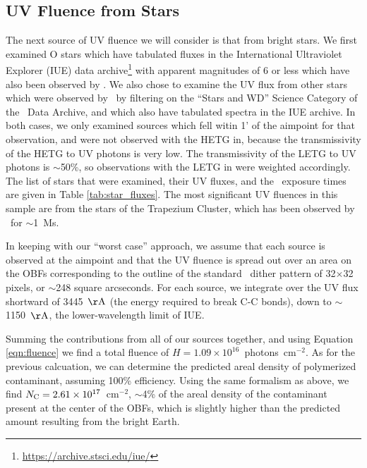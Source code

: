 \documentclass[11pt]{article}
\begin{document}
\subsection{UV Fluence from Stars}\label{sec:stars}

The next source of UV fluence we will consider is that from bright stars. We first examined O stars which have tabulated
fluxes in the International Ultraviolet Explorer (IUE) data archive\footnote{\url{https://archive.stsci.edu/iue/}} with
apparent magnitudes of 6 or less which have also been observed by \chandra. We also chose to examine the UV flux from
other stars which were observed by \chandra~by filtering on the ``Stars and WD'' Science Category of the \chandra~Data
Archive, and which also have tabulated spectra in the IUE archive. In both cases, we only examined sources which fell
witin 1' of the aimpoint for that observation, and were not observed with the HETG in, because the transmissivity of
the HETG to UV photons is very low. The transmissivity of the LETG to UV photons is $\sim$50\%, so observations with
the LETG in were weighted accordingly. The list of stars that were examined, their UV fluxes, and the \chandra~exposure
times are given in Table \ref{tab:star_fluxes}. The most significant UV fluences in this sample are from the stars of
the Trapezium Cluster, which has been observed by \chandra~for $\sim$1~Ms.



In keeping with our ``worst case'' approach, we assume that each source is observed at the aimpoint and that the UV
fluence is spread out over an area on the OBFs corresponding to the outline of the standard \chandra~dither pattern of
32$\times$32 pixels, or $\sim$248 square arcseconds. For each source, we integrate over the UV flux shortward of
3445~${\rm \AA}$ (the energy required to break C-C bonds), down to $\sim$1150~${\rm \AA}$, the lower-wavelength limit
of IUE.

Summing the contributions from all of our sources together, and using Equation \ref{eqn:fluence} we find a total
fluence of $H = 1.09 \times 10^{16}$~photons~cm$^{-2}$. As for the previous calcuation, we can determine the predicted
areal density of polymerized contaminant, assuming 100\% efficiency. Using the same formalism as above, we find
$N_{\rm C} = 2.61 \times 10^{17}$~cm$^{-2}$, $\sim$4\% of the areal density of the contaminant present at the center of
the OBFs, which is slightly higher than the predicted amount resulting from the bright Earth.
\end{document}

